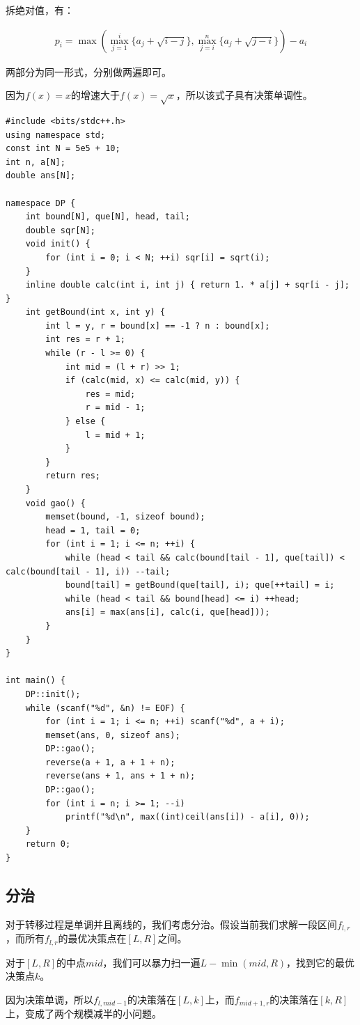 拆绝对值，有：

\begin{eqnarray*}
p_i = \max(\max_{j=1}^i\{a_j+\sqrt{i-j}\},\max_{j=i}^n\{a_j+\sqrt{j-i}\})-a_i
\end{eqnarray*}

两部分为同一形式，分别做两遍即可。\par
因为$f(x) = x$的增速大于$f(x) = \sqrt{x}$，所以该式子具有决策单调性。

\begin{lstlisting}
#include <bits/stdc++.h>
using namespace std;
const int N = 5e5 + 10; 
int n, a[N]; 
double ans[N];

namespace DP {
	int bound[N], que[N], head, tail;
    double sqr[N];
	void init() {
		for (int i = 0; i < N; ++i) sqr[i] = sqrt(i);
	}	
	inline double calc(int i, int j) { return 1. * a[j] + sqr[i - j]; }
	int getBound(int x, int y) {
		int l = y, r = bound[x] == -1 ? n : bound[x];
		int res = r + 1;
		while (r - l >= 0) {
			int mid = (l + r) >> 1;
			if (calc(mid, x) <= calc(mid, y)) {
				res = mid;
				r = mid - 1;
			} else {
				l = mid + 1;
			}
		}
		return res;
	}
	void gao() {
		memset(bound, -1, sizeof bound);
		head = 1, tail = 0;
		for (int i = 1; i <= n; ++i) {
			while (head < tail && calc(bound[tail - 1], que[tail]) < calc(bound[tail - 1], i)) --tail;
			bound[tail] = getBound(que[tail], i); que[++tail] = i;
			while (head < tail && bound[head] <= i) ++head;
			ans[i] = max(ans[i], calc(i, que[head]));
		}
	}
}

int main() {
	DP::init();
	while (scanf("%d", &n) != EOF) {
		for (int i = 1; i <= n; ++i) scanf("%d", a + i);
		memset(ans, 0, sizeof ans);
		DP::gao();
		reverse(a + 1, a + 1 + n);
		reverse(ans + 1, ans + 1 + n);
		DP::gao();
		for (int i = n; i >= 1; --i)
			printf("%d\n", max((int)ceil(ans[i]) - a[i], 0));
	}
	return 0;
}
\end{lstlisting}

\subsection{分治}

对于转移过程是单调并且离线的，我们考虑分治。假设当前我们求解一段区间$f_{l,r}$，而所有$f_{l,r}$的最优决策点在$[L, R]$之间。\par
对于$[L, R]$的中点$mid$，我们可以暴力扫一遍$L-\min(mid, R)$，找到它的最优决策点$k$。\par
因为决策单调，所以$f_{l, mid - 1}$的决策落在$[L,k]$上，而$f_{mid + 1, r}$的决策落在$[k, R]$上，变成了两个规模减半的小问题。

